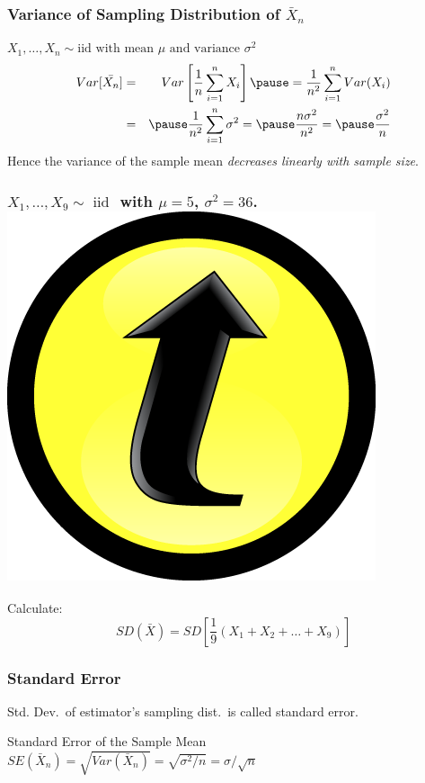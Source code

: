 \documentclass[handout]{beamer}
\begin{document}
\begin{frame}
\frametitle{Variance of Sampling Distribution of $\bar{X}_n$}
\alert{$X_1, \hdots, X_n \sim \mbox{iid with mean }\mu \mbox{ and variance } \sigma^2$}
\begin{eqnarray*}
Var[\bar{X_n}] &=& Var\left[ \frac{1}{n}\sum_{i=1}^n X_i \right] \pause= \frac{1}{n^2} \sum_{i=1}^n Var(X_i) \\
&=& \pause \frac{1}{n^2} \sum_{i=1}^n \sigma^2 = \pause \frac{n\sigma^2}{n^2} = \pause \frac{\sigma^2}{n}
\end{eqnarray*}
\pause
\alert{Hence the variance of the sample mean \emph{decreases linearly with sample size}.}
\end{frame}
\begin{frame}
\frametitle{$X_1,\hdots, X_{9} \sim \mbox{ iid }$ with $\mu=5$, $\sigma^2 = 36$. \hfill\includegraphics[scale = 0.05]{./images/clicker}}

\large Calculate:
	 $$SD(\bar{X}) = SD\left[\frac{1}{9}(X_1 + X_2 + \hdots + X_{9})\right]$$
\end{frame}
\begin{frame}
\frametitle{Standard Error}
Std. Dev.\ of estimator's sampling dist.\ is called \alert{standard error}.
\begin{block}{Standard Error of the Sample Mean}
$SE(\bar{X}_n)= \sqrt{Var\left(\bar{X}_n\right)}= \sqrt{\sigma^2/n}=\sigma/\sqrt{n}$
\end{block}
\end{frame}
\end{document}
